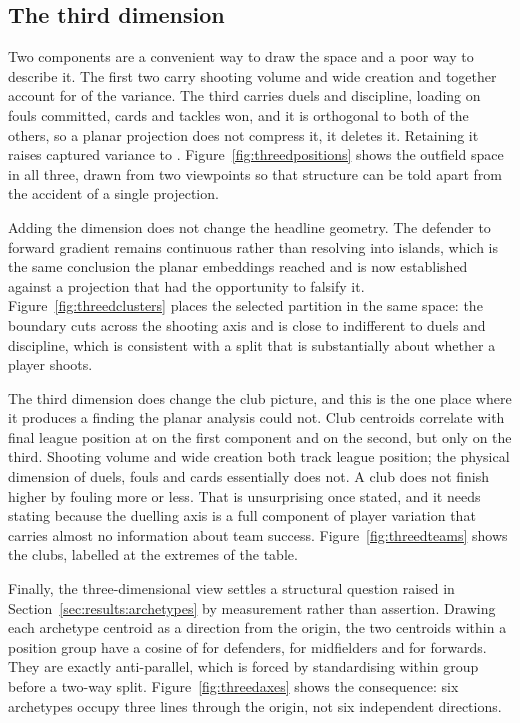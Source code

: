 \subsection{The third dimension}
\label{sec:results:threed}

Two components are a convenient way to draw the space and a poor way to describe it. The
first two carry shooting volume and wide creation and together account for
\ThreeDVarTwo{} of the variance. The third carries duels and discipline, loading on fouls
committed, cards and tackles won, and it is orthogonal to both of the others, so a planar
projection does not compress it, it deletes it. Retaining it raises captured variance to
\ThreeDVarThree{}. Figure~\ref{fig:threedpositions} shows the outfield space in all three,
drawn from two viewpoints so that structure can be told apart from the accident of a single
projection.

Adding the dimension does not change the headline geometry. The defender to forward gradient
remains continuous rather than resolving into islands, which is the same conclusion the
planar embeddings reached and is now established against a projection that had the
opportunity to falsify it. Figure~\ref{fig:threedclusters} places the selected partition in
the same space: the boundary cuts across the shooting axis and is close to indifferent to
duels and discipline, which is consistent with a split that is substantially about whether a
player shoots.

The third dimension does change the club picture, and this is the one place where it
produces a finding the planar analysis could not. Club centroids correlate with final
league position at \ThreeDTeamPCOne{} on the first component and \ThreeDTeamPCTwo{} on the
second, but only \ThreeDTeamPCThree{} on the third. Shooting volume and wide creation both
track league position; the physical dimension of duels, fouls and cards essentially does
not. A club does not finish higher by fouling more or less. That is unsurprising once stated,
and it needs stating because the duelling axis is a full component of player variation
that carries almost no information about team success.
Figure~\ref{fig:threedteams} shows the clubs, labelled at the extremes of the table.

Finally, the three-dimensional view settles a structural question raised in
Section~\ref{sec:results:archetypes} by measurement rather than assertion. Drawing each
archetype centroid as a direction from the origin, the two centroids within a position
group have a cosine of \CosineDF{} for defenders, \CosineMF{} for midfielders and
\CosineFW{} for forwards. They are exactly anti-parallel, which is forced by standardising
within group before a two-way split. Figure~\ref{fig:threedaxes} shows the consequence: six
archetypes occupy three lines through the origin, not six independent directions.

